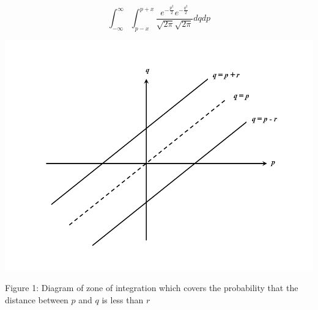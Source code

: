 \documentclass[11pt]{article} %
\begin{document}
$$\int _{-\infty }^{\infty }\int _{p-x}^{p+x}\frac{e^{-\frac{p^2}{2}}
   e^{-\frac{q^2}{2}}}{\sqrt{2 \pi } \sqrt{2 \pi }}dqdp$$

\begin{center}
\includegraphics[scale=0.42]{Slide1.png}
\end{center}
Figure 1: Diagram of zone of integration which covers the probability that the distance between $p$ and $q$ is less than $r$
\end{document}
